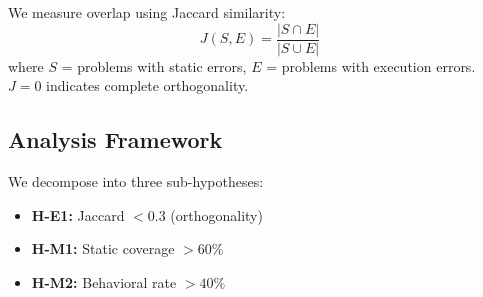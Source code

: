 We measure overlap using Jaccard similarity:
\begin{equation}
J(S, E) = \frac{|S \cap E|}{|S \cup E|}
\end{equation}
where $S$ = problems with static errors, $E$ = problems with execution errors. $J = 0$ indicates complete orthogonality.

\subsection{Analysis Framework}

We decompose into three sub-hypotheses:
\begin{itemize}
    \item \textbf{H-E1:} Jaccard $< 0.3$ (orthogonality)
    \item \textbf{H-M1:} Static coverage $> 60\%$
    \item \textbf{H-M2:} Behavioral rate $> 40\%$
\end{itemize}
